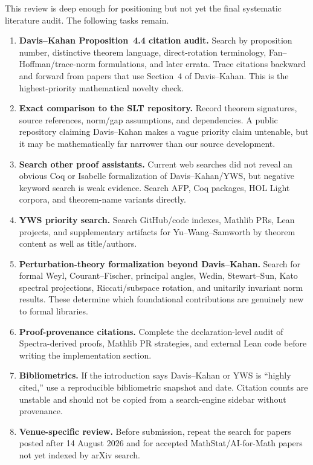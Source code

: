 \documentclass[11pt]{article}
\begin{document}
This review is deep enough for positioning but not yet the final systematic
literature audit.  The following tasks remain.

\begin{enumerate}
  \item \textbf{Davis--Kahan Proposition~4.4 citation audit.}  Search by
        proposition number, distinctive theorem language, direct-rotation
        terminology, Fan--Hoffman/trace-norm formulations, and later errata.
        Trace citations backward and forward from papers that use Section~4 of
        Davis--Kahan.  This is the highest-priority mathematical novelty check.
  \item \textbf{Exact comparison to the SLT repository.}  Record theorem
        signatures, source references, norm/gap assumptions, and dependencies.
        A public repository claiming Davis--Kahan makes a vague priority claim
        untenable, but it may be mathematically far narrower than our source
        development.
  \item \textbf{Search other proof assistants.}  Current web searches did not
        reveal an obvious Coq or Isabelle formalization of Davis--Kahan/YWS, but
        negative keyword search is weak evidence.  Search AFP, Coq packages,
        HOL Light corpora, and theorem-name variants directly.
  \item \textbf{YWS priority search.}  Search GitHub/code indexes, Mathlib PRs,
        Lean projects, and supplementary artifacts for Yu--Wang--Samworth by
        theorem content as well as title/authors.
  \item \textbf{Perturbation-theory formalization beyond Davis--Kahan.}
        Search for formal Weyl, Courant--Fischer, principal angles, Wedin,
        Stewart--Sun, Kato spectral projections, Riccati/subspace rotation, and
        unitarily invariant norm results.  These determine which foundational
        contributions are genuinely new to formal libraries.
  \item \textbf{Proof-provenance citations.}  Complete the declaration-level
        audit of Spectra-derived proofs, Mathlib PR strategies, and external Lean
        code before writing the implementation section.
  \item \textbf{Bibliometrics.}  If the introduction says Davis--Kahan or YWS
        is ``highly cited,'' use a reproducible bibliometric snapshot and date.
        Citation counts are unstable and should not be copied from a search-engine
        sidebar without provenance.
  \item \textbf{Venue-specific review.}  Before submission, repeat the search
        for papers posted after 14 August 2026 and for accepted MathStat/AI-for-Math
        papers not yet indexed by arXiv search.
\end{enumerate}
\end{document}
